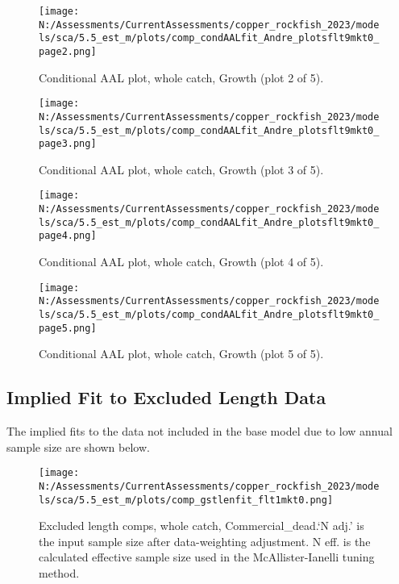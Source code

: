 \documentclass[11pt,
  english,
  letterpaper,
]{article}
\begin{document}
\begin{figure}
\centering
\texttt{[image: N:/Assessments/CurrentAssessments/copper\_rockfish\_2023/models/sca/5.5\_est\_m/plots/comp\_condAALfit\_Andre\_plotsflt9mkt0\_page2.png]}
\caption{Conditional AAL plot, whole catch, Growth (plot 2 of 5).\label{fig:comp_condAALfit_Andre_plotsflt9mkt0_page2}}
\end{figure}

\begin{figure}
\centering
\texttt{[image: N:/Assessments/CurrentAssessments/copper\_rockfish\_2023/models/sca/5.5\_est\_m/plots/comp\_condAALfit\_Andre\_plotsflt9mkt0\_page3.png]}
\caption{Conditional AAL plot, whole catch, Growth (plot 3 of 5).\label{fig:comp_condAALfit_Andre_plotsflt9mkt0_page3}}
\end{figure}

\begin{figure}
\centering
\texttt{[image: N:/Assessments/CurrentAssessments/copper\_rockfish\_2023/models/sca/5.5\_est\_m/plots/comp\_condAALfit\_Andre\_plotsflt9mkt0\_page4.png]}
\caption{Conditional AAL plot, whole catch, Growth (plot 4 of 5).\label{fig:comp_condAALfit_Andre_plotsflt9mkt0_page4}}
\end{figure}

\begin{figure}
\centering
\texttt{[image: N:/Assessments/CurrentAssessments/copper\_rockfish\_2023/models/sca/5.5\_est\_m/plots/comp\_condAALfit\_Andre\_plotsflt9mkt0\_page5.png]}
\caption{Conditional AAL plot, whole catch, Growth (plot 5 of 5).\label{fig:comp_condAALfit_Andre_plotsflt9mkt0_page5}}
\end{figure}

\hypertarget{excluded-data}{%
\subsection{Implied Fit to Excluded Length Data}\label{excluded-data}}

The implied fits to the data not included in the base model due to low annual sample size are shown below.

\begin{figure}
\centering
\texttt{[image: N:/Assessments/CurrentAssessments/copper\_rockfish\_2023/models/sca/5.5\_est\_m/plots/comp\_gstlenfit\_flt1mkt0.png]}
\caption{Excluded length comps, whole catch, Commercial\_dead.`N adj.' is the input sample size after data-weighting adjustment. N eff. is the calculated effective sample size used in the McAllister-Ianelli tuning method.\label{fig:comp_gstlenfit_flt1mkt0}}
\end{figure}
\end{document}
